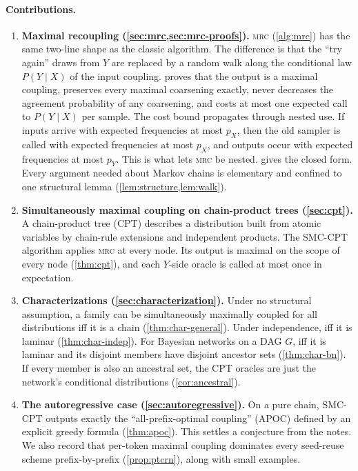 \documentclass[11pt]{article}
\theoremstyle{definition}
\newcommand{\pX}{p_X}
\newcommand{\pY}{p_Y}
\newcommand{\MRC}{\textnormal{\textsc{mrc}}}
\begin{document}
\paragraph{Contributions.}
\begin{enumerate}
  \item \textbf{Maximal recoupling (\cref{sec:mrc,sec:mrc-proofs}).} \MRC{}
  (\cref{alg:mrc}) has the same two-line shape as the classic algorithm. The
  difference is that the ``try again'' draws from $Y$ are replaced by a random
  walk along the conditional law $P(Y\mid X)$ of the input coupling.
   proves that the output is a maximal coupling, preserves every
  maximal coarsening exactly, never decreases the agreement probability of any
  coarsening, and costs at most one expected call to $P(Y\mid X)$ per sample.
  The cost bound propagates through nested use. If inputs arrive with expected
  frequencies at most $\pX$, then the old sampler is called with expected
  frequencies at most $\pX$, and outputs occur with expected frequencies at most
  $\pY$. This is what lets \MRC{} be nested.
   gives the closed form. Every argument needed about
  Markov chains is elementary and confined to one structural lemma
  (\cref{lem:structure,lem:walk}).
  \item \textbf{Simultaneously maximal coupling on chain-product trees
  (\cref{sec:cpt}).} A chain-product tree (CPT) describes a distribution built
  from atomic variables by chain-rule extensions and independent products. The
  SMC-CPT algorithm applies \MRC{} at every node. Its output is maximal on the
  scope of every node (\cref{thm:cpt}), and each $Y$-side oracle is called at
  most once in expectation.
  \item \textbf{Characterizations (\cref{sec:characterization}).} Under no
  structural assumption, a family can be simultaneously maximally coupled for
  all distributions iff it is a chain (\cref{thm:char-general}). Under
  independence, iff it is laminar (\cref{thm:char-indep}). For Bayesian networks
  on a DAG $G$, iff it is laminar and its disjoint members have disjoint
  ancestor sets (\cref{thm:char-bn}). If every member is also an ancestral set,
  the CPT oracles are just the network's conditional distributions
  (\cref{cor:ancestral}).
  \item \textbf{The autoregressive case (\cref{sec:autoregressive}).} On a pure
  chain, SMC-CPT outputs exactly the ``all-prefix-optimal coupling'' (APOC)
  defined by an explicit greedy formula (\cref{thm:apoc}). This settles a
  conjecture from the notes. We also record that per-token maximal coupling
  dominates every seed-reuse scheme prefix-by-prefix (\cref{prop:ptcrn}), along
  with small examples.
\end{enumerate}
\end{document}
